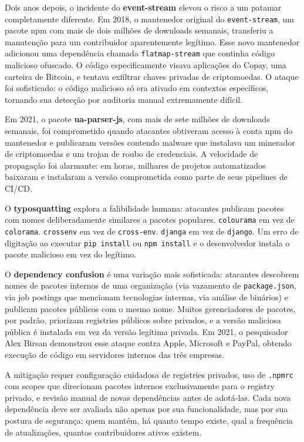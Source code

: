 Dois anos depois, o incidente do \textbf{event-stream} elevou o risco a um
patamar completamente diferente. Em 2018, o mantenedor original do
\texttt{event-stream}, um pacote npm com mais de dois milhões de downloads
semanais, transferiu a manutenção para um contribuidor aparentemente legítimo.
Esse novo mantenedor adicionou uma dependência chamada \texttt{flatmap-stream}
que continha código malicioso ofuscado. O código especificamente visava
aplicações do Copay, uma carteira de Bitcoin, e tentava exfiltrar chaves
privadas de criptomoedas. O ataque foi sofisticado: o código malicioso só era
ativado em contextos específicos, tornando sua detecção por auditoria manual
extremamente difícil.

Em 2021, o pacote \textbf{ua-parser-js}, com mais de sete milhões de downloads
semanais, foi comprometido quando atacantes obtiveram acesso à conta npm do
mantenedor e publicaram versões contendo malware que instalava um minerador de
criptomoedas e um trojan de roubo de credenciais. A velocidade de propagação foi
alarmante: em horas, milhares de projetos automatizados baixaram e instalaram a
versão comprometida como parte de seus pipelines de CI/CD.

O \textbf{typosquatting} explora a falibilidade humana: atacantes publicam
pacotes com nomes deliberadamente similares a pacotes populares.
\texttt{colourama} em vez de \texttt{colorama}. \texttt{crossenv} em vez de
\texttt{cross-env}. \texttt{djanga} em vez de \texttt{django}. Um erro de
digitação ao executar \texttt{pip install} ou \texttt{npm install} e o
desenvolvedor instala o pacote malicioso em vez do legítimo.

O \textbf{dependency confusion} é uma variação mais sofisticada: atacantes
descobrem nomes de pacotes internos de uma organização (via vazamento de
\texttt{package.json}, via job postings que mencionam tecnologias internas, via
análise de binários) e publicam pacotes públicos com o mesmo nome. Muitos
gerenciadores de pacotes, por padrão, priorizam registries públicos sobre
privados, e a versão maliciosa pública é instalada em vez da versão legítima
privada. Em 2021, o pesquisador Alex Birsan demonstrou esse ataque contra Apple,
Microsoft e PayPal, obtendo execução de código em servidores internos das três
empresas.

A mitigação requer configuração cuidadosa de registries privados, uso de
\texttt{.npmrc} com scopes que direcionam pacotes internos exclusivamente para
o registry privado, e revisão manual de novas dependências antes de adotá-las.
Cada nova dependência deve ser avaliada não apenas por sua funcionalidade, mas
por sua postura de segurança: quem mantém, há quanto tempo existe, qual a
frequência de atualizações, quantos contribuidores ativos existem.

